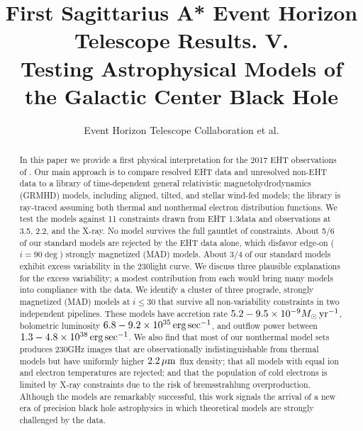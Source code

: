 \documentclass[twocolumn,twocolappendix,tighten,dvipsnames,linenumbers]{aastex63}
\begin{document}
\title{First Sagittarius A* Event Horizon Telescope Results. V.\\
  Testing Astrophysical Models of the Galactic Center Black Hole}

%
\author{Event Horizon Telescope Collaboration et al.}


\received{\today}
\revised{\today}

\begin{abstract}

  In this paper we provide a first physical interpretation for the 2017 EHT observations of \sgra.  Our main approach is to compare resolved EHT data and unresolved non-EHT data to a library of time-dependent general relativistic  magnetohydrodynamics (GRMHD) models, including aligned, tilted, and stellar wind-fed models; the library is ray-traced assuming both thermal and nonthermal electron distribution functions. We test the models against 11 constraints drawn from EHT 1.3\mm data and observations at 3.5\mm, 2.2\um, and the X-ray.  No model survives the full gauntlet of constraints. About 5/6 of our standard models are rejected by the EHT data alone, which disfavor edge-on ($i = 90\deg$) strongly magnetized (MAD) models.  About 3/4 of our standard models exhibit excess variability in the 230\GHz light curve.  We discuss three plausible explanations for the excess variability; a modest contribution from each would bring many models into compliance with the data.  We identify a cluster of three prograde, strongly magnetized (MAD) models at $i \le 30$ that survive all non-variability constraints in two independent pipelines.  These models have accretion rate $5.2 - 9.5 \times 10^{-9} M_\odot\,\mathrm{yr}^{-1}$, bolometric luminosity $6.8-9.2\times10^{35} \,\mathrm{erg} \,\mathrm{sec}^{-1}$, and outflow power between $1.3-4.8 \times 10^{38} \,\mathrm{erg} \,\mathrm{sec}^{-1}$.  We also find that most of our nonthermal model sets produces 230GHz images that are observationally indistinguishable from thermal models but have uniformly higher $2.2\,\mu\mathrm{m}$ flux density; that all models with equal ion and electron temperatures are rejected; and that the population of cold electrons is limited by X-ray constraints due to the risk of bremsstrahlung overproduction.  Although the models are remarkably successful, this work signals the arrival of a new era of precision black hole astrophysics in which theoretical models are strongly challenged by the data.
  
\end{abstract}
\end{document}
